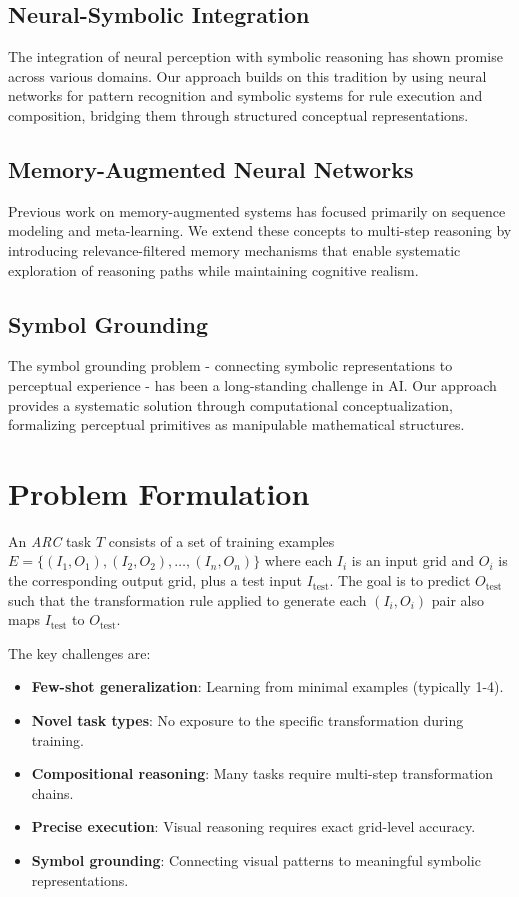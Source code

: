 \documentclass[12pt]{article}
\newcommand{\arc}{\textit{ARC}}
\begin{document}
\subsection{Neural-Symbolic Integration}

The integration of neural perception with symbolic reasoning has shown promise across various domains. Our approach builds on this tradition by using neural networks for pattern recognition and symbolic systems for rule execution and composition, bridging them through structured conceptual representations.

\subsection{Memory-Augmented Neural Networks}

Previous work on memory-augmented systems has focused primarily on sequence modeling and meta-learning. We extend these concepts to multi-step reasoning by introducing relevance-filtered memory mechanisms that enable systematic exploration of reasoning paths while maintaining cognitive realism.

\subsection{Symbol Grounding}

The symbol grounding problem - connecting symbolic representations to perceptual experience - has been a long-standing challenge in AI. Our approach provides a systematic solution through computational conceptualization, formalizing perceptual primitives as manipulable mathematical structures.

\section{Problem Formulation}

An \arc{} task $T$ consists of a set of training examples $E = \{(I_1, O_1), (I_2, O_2), \dots, (I_n, O_n)\}$ where each $I_i$ is an input grid and $O_i$ is the corresponding output grid, plus a test input $I_{\text{test}}$. The goal is to predict $O_{\text{test}}$ such that the transformation rule applied to generate each $(I_i, O_i)$ pair also maps $I_{\text{test}}$ to $O_{\text{test}}$.

The key challenges are:
\begin{itemize}[noitemsep,topsep=0pt]
\item \textbf{Few-shot generalization}: Learning from minimal examples (typically 1-4).
\item \textbf{Novel task types}: No exposure to the specific transformation during training.
\item \textbf{Compositional reasoning}: Many tasks require multi-step transformation chains.
\item \textbf{Precise execution}: Visual reasoning requires exact grid-level accuracy.
\item \textbf{Symbol grounding}: Connecting visual patterns to meaningful symbolic representations.
\end{itemize}
\end{document}

